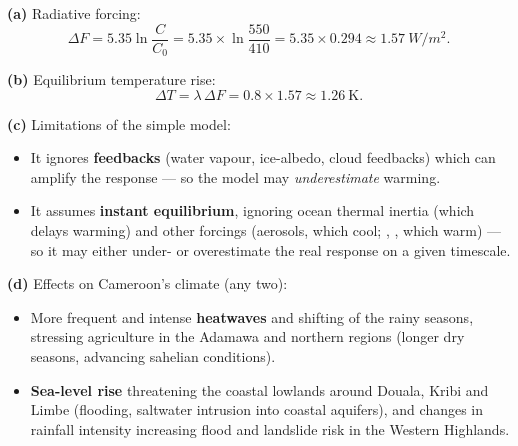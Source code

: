 \documentclass[11pt]{article}
\begin{document}
\begin{corrige}
\textbf{(a)} Radiative forcing:
\[ \Delta F = 5.35\ln\frac{C}{C_0} = 5.35 \times \ln\frac{550}{410} = 5.35 \times 0.294 \approx \SI{1.57}{W/m^2}. \]

\textbf{(b)} Equilibrium temperature rise:
\[ \Delta T = \lambda\,\Delta F = 0.8 \times 1.57 \approx \SI{1.26}{\kelvin}. \]

\textbf{(c)} Limitations of the simple model:
\begin{itemize}
\item It ignores \textbf{feedbacks} (water vapour, ice-albedo, cloud feedbacks) which can amplify the response — so the model may \emph{underestimate} warming.
\item It assumes \textbf{instant equilibrium}, ignoring ocean thermal inertia (which delays warming) and other forcings (aerosols, which cool; , , which warm) — so it may either under- or overestimate the real response on a given timescale.
\end{itemize}

\textbf{(d)} Effects on Cameroon's climate (any two):
\begin{itemize}
\item More frequent and intense \textbf{heatwaves} and shifting of the rainy seasons, stressing agriculture in the Adamawa and northern regions (longer dry seasons, advancing sahelian conditions).
\item \textbf{Sea-level rise} threatening the coastal lowlands around Douala, Kribi and Limbe (flooding, saltwater intrusion into coastal aquifers), and changes in rainfall intensity increasing flood and landslide risk in the Western Highlands.
\end{itemize}
\end{corrige}
\end{document}
